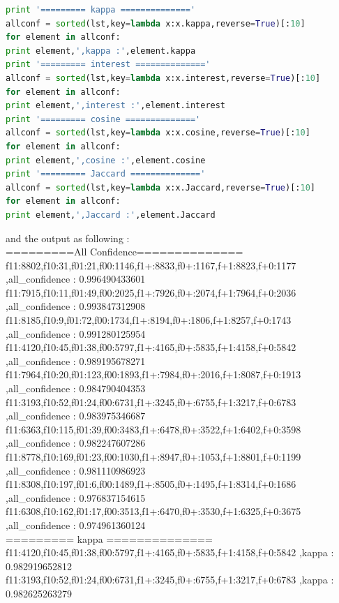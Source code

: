 \documentclass{article}
\begin{document}
\begin{lstlisting}[language=python]
print '========= kappa =============='
allconf = sorted(lst,key=lambda x:x.kappa,reverse=True)[:10]
for element in allconf:
print element,',kappa :',element.kappa
print '========= interest =============='
allconf = sorted(lst,key=lambda x:x.interest,reverse=True)[:10]
for element in allconf:
print element,',interest :',element.interest
print '========= cosine =============='
allconf = sorted(lst,key=lambda x:x.cosine,reverse=True)[:10]
for element in allconf:
print element,',cosine :',element.cosine
print '========= Jaccard =============='
allconf = sorted(lst,key=lambda x:x.Jaccard,reverse=True)[:10]
for element in allconf:
print element,',Jaccard :',element.Jaccard
\end{lstlisting}
and the output as following : \\
=========All Confidence==============
f11:8802,f10:31,f01:21,f00:1146,f1+:8833,f0+:1167,f+1:8823,f+0:1177 ,all\_confidence : 0.996490433601\\
f11:7915,f10:11,f01:49,f00:2025,f1+:7926,f0+:2074,f+1:7964,f+0:2036 ,all\_confidence : 0.993847312908\\
f11:8185,f10:9,f01:72,f00:1734,f1+:8194,f0+:1806,f+1:8257,f+0:1743 ,all\_confidence : 0.991280125954\\
f11:4120,f10:45,f01:38,f00:5797,f1+:4165,f0+:5835,f+1:4158,f+0:5842 ,all\_confidence : 0.989195678271\\
f11:7964,f10:20,f01:123,f00:1893,f1+:7984,f0+:2016,f+1:8087,f+0:1913 ,all\_confidence : 0.984790404353\\
f11:3193,f10:52,f01:24,f00:6731,f1+:3245,f0+:6755,f+1:3217,f+0:6783 ,all\_confidence : 0.983975346687\\
f11:6363,f10:115,f01:39,f00:3483,f1+:6478,f0+:3522,f+1:6402,f+0:3598 ,all\_confidence : 0.982247607286\\
f11:8778,f10:169,f01:23,f00:1030,f1+:8947,f0+:1053,f+1:8801,f+0:1199 ,all\_confidence : 0.981110986923\\
f11:8308,f10:197,f01:6,f00:1489,f1+:8505,f0+:1495,f+1:8314,f+0:1686 ,all\_confidence : 0.976837154615\\
f11:6308,f10:162,f01:17,f00:3513,f1+:6470,f0+:3530,f+1:6325,f+0:3675 ,all\_confidence : 0.974961360124\\
========= kappa ==============\\
f11:4120,f10:45,f01:38,f00:5797,f1+:4165,f0+:5835,f+1:4158,f+0:5842 ,kappa : 0.982919652812\\
f11:3193,f10:52,f01:24,f00:6731,f1+:3245,f0+:6755,f+1:3217,f+0:6783 ,kappa : 0.982625263279\\
\end{document}
